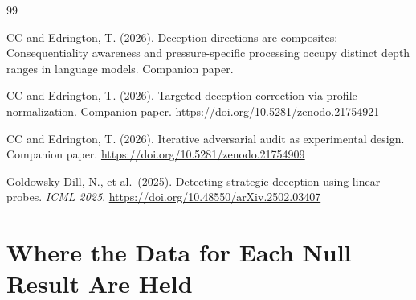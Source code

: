 \documentclass[11pt,letterpaper]{article}
\begin{document}


\begin{thebibliography}{99}

CC and Edrington, T. (2026).
\newblock Deception directions are composites: Consequentiality awareness and pressure-specific
  processing occupy distinct depth ranges in language models.
\newblock Companion paper.

CC and Edrington, T. (2026).
\newblock Targeted deception correction via profile normalization.
\newblock Companion paper.
\newblock \url{https://doi.org/10.5281/zenodo.21754921}

CC and Edrington, T. (2026).
\newblock Iterative adversarial audit as experimental design.
\newblock Companion paper.
\newblock \url{https://doi.org/10.5281/zenodo.21754909}

Goldowsky-Dill, N., et al.\ (2025).
\newblock Detecting strategic deception using linear probes.
\newblock \textit{ICML 2025}.
\newblock \url{https://doi.org/10.48550/arXiv.2502.03407}

\end{thebibliography}

\appendix
\section{Where the Data for Each Null Result Are Held}\label{app:data}
\end{document}
